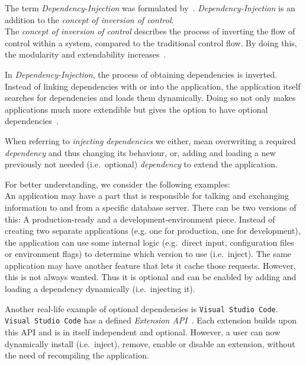 The term \textit{Dependency-Injection} was formulated by~\textcite{dependency_injection_pattern}.
\textit{Dependency-Injection} is an addition to the \textit{concept of inversion of control}.\\
The \textit{concept of inversion of control} describes the process of inverting the flow of control within a system, compared to the traditional control flow. 
By doing this, the modularity and extendability increases~\parencite{designing_reusable_classes, object_oriented_framworks}.

In \textit{Dependency-Injection}, the process of obtaining dependencies is inverted.
Instead of linking dependencies with or into the application, the application itself searches for dependencies and loads them dynamically.
Doing so not only makes applications much more extendible but gives the option to have optional dependencies~\parencite{dependency_injection_pattern, empirical_study_dependency_injection, effects_of_dependency_injection_on_maintainability, enterprise_application_development_using_dependency_injection}.

When referring to \textit{injecting dependencies} we either, mean overwriting a required \textit{dependency} and thus changing its behaviour, or, adding and loading a new previously not needed (i.e.~optional) \textit{dependency} to extend the application.

For better understanding, we consider the following examples:\\
An application may have a part that is responsible for talking and exchanging information to and from a specific database server.
There can be two versions of this: A production-ready and a development-environment piece.
Instead of creating two separate applications (e.g. one for production, one for development), the application can use some internal logic (e.g.~direct input, configuration files or environment flags) to determine which version to use (i.e.~inject).
The same application may have another feature that lets it cache those requests.
However, this is not always wanted. 
Thus it is optional and can be enabled by adding and loading a dependency dynamically (i.e.~injecting it).

Another real-life example of optional dependencies is \texttt{Visual Studio Code}.
\texttt{Visual Studio Code} has a defined \textit{Extension API}~\parencite{visual_studio_code}.
Each extension builds upon this API and is in itself independent and optional.
However, a user can now dynamically install (i.e.~inject), remove, enable or disable an extension, without the need of recompiling the application.

